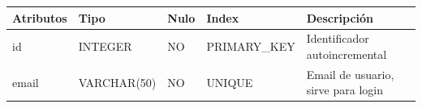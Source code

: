 \documentclass[12pt,a4paperpaper,]{report}
\begin{document}
\begin{longtable}[]{@{}lllll@{}}
\toprule
\begin{minipage}[b]{0.20\columnwidth}\raggedright\strut
Atributos\strut
\end{minipage} & \begin{minipage}[b]{0.18\columnwidth}\raggedright\strut
Tipo\strut
\end{minipage} & \begin{minipage}[b]{0.15\columnwidth}\raggedright\strut
Nulo\strut
\end{minipage} & \begin{minipage}[b]{0.18\columnwidth}\raggedright\strut
Index\strut
\end{minipage} & \begin{minipage}[b]{0.15\columnwidth}\raggedright\strut
Descripción\strut
\end{minipage}\tabularnewline
\midrule
\endhead
\begin{minipage}[t]{0.20\columnwidth}\raggedright\strut
id\strut
\end{minipage} & \begin{minipage}[t]{0.18\columnwidth}\raggedright\strut
INTEGER\strut
\end{minipage} & \begin{minipage}[t]{0.15\columnwidth}\raggedright\strut
NO\strut
\end{minipage} & \begin{minipage}[t]{0.18\columnwidth}\raggedright\strut
PRIMARY\_KEY\strut
\end{minipage} & \begin{minipage}[t]{0.15\columnwidth}\raggedright\strut
Identificador autoincremental\strut
\end{minipage}\tabularnewline
\begin{minipage}[t]{0.20\columnwidth}\raggedright\strut
email\strut
\end{minipage} & \begin{minipage}[t]{0.18\columnwidth}\raggedright\strut
VARCHAR(50)\strut
\end{minipage} & \begin{minipage}[t]{0.15\columnwidth}\raggedright\strut
NO\strut
\end{minipage} & \begin{minipage}[t]{0.18\columnwidth}\raggedright\strut
UNIQUE\strut
\end{minipage} & \begin{minipage}[t]{0.15\columnwidth}\raggedright\strut
Email de usuario, sirve para login\strut

\end{minipage}
\end{longtable}
\end{document}
